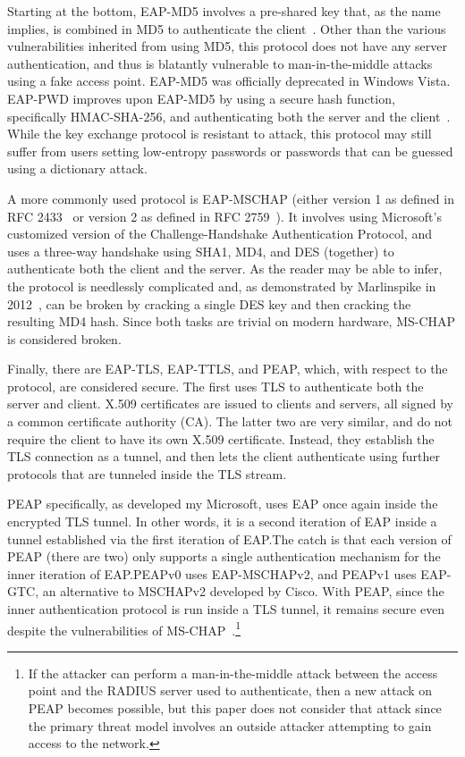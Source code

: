 \documentclass[journal, compsoc]{IEEEtran}
\begin{document}
Starting at the bottom, EAP-MD5 involves a pre-shared key that, as the
name implies, is combined in MD5 to authenticate the
client~\cite{aboba2004extensible}. Other than the various
vulnerabilities inherited from using MD5, this protocol does not have
any server authentication, and thus is blatantly vulnerable to
man-in-the-middle attacks using a fake access point. EAP-MD5 was
officially deprecated in Windows Vista. EAP-PWD improves upon EAP-MD5
by using a secure hash function, specifically HMAC-SHA-256, and
authenticating both the server and the
client~\cite{harkins2010extensible}. While the key exchange protocol
is resistant to attack, this protocol may still suffer from users
setting low-entropy passwords or passwords that can be guessed using a
dictionary attack.

A more commonly used protocol is EAP-MSCHAP (either version 1 as
defined in RFC 2433~\cite{zorn1998microsoft} or version 2 as defined
in RFC 2759~\cite{zorn2000microsoft}). It involves using Microsoft's
customized version of the Challenge-Handshake Authentication Protocol,
and uses a three-way handshake using SHA1, MD4, and DES (together) to
authenticate both the client and the server. As the reader may be able
to infer, the protocol is needlessly complicated and, as demonstrated
by Marlinspike in 2012~\cite{marlinspike2012divide}, can be broken by
cracking a single DES key and then cracking the resulting MD4
hash. Since both tasks are trivial on modern hardware, MS-CHAP is
considered broken.

Finally, there are EAP-TLS, EAP-TTLS, and PEAP, which, with respect to
the protocol, are considered secure. The first uses TLS to
authenticate both the server and client. X.509 certificates are issued
to clients and servers, all signed by a common certificate authority
(CA). The latter two are very similar, and do not require the client
to have its own X.509 certificate. Instead, they establish the TLS
connection as a tunnel, and then lets the client authenticate using
further protocols that are tunneled inside the TLS stream.

PEAP specifically, as developed my Microsoft, uses EAP once again
inside the encrypted TLS tunnel. In other words, it is a second
iteration of EAP inside a tunnel established via the first iteration
of EAP.\@ The catch is that each version of PEAP (there are two) only
supports a single authentication mechanism for the inner iteration of
EAP.\@ PEAPv0 uses EAP-MSCHAPv2, and PEAPv1 uses EAP-GTC, an alternative
to MSCHAPv2 developed by Cisco. With PEAP, since the inner
authentication protocol is run inside a TLS tunnel, it remains secure
even despite the vulnerabilities of
MS-CHAP~\cite{dunstan2010attacking}.\footnote{If the attacker can
  perform a man-in-the-middle attack between the access point and the
  RADIUS server used to authenticate, then a new attack on PEAP
  becomes possible, but this paper does not consider that attack since
  the primary threat model involves an outside attacker attempting to
  gain access to the network.}
\end{document}
